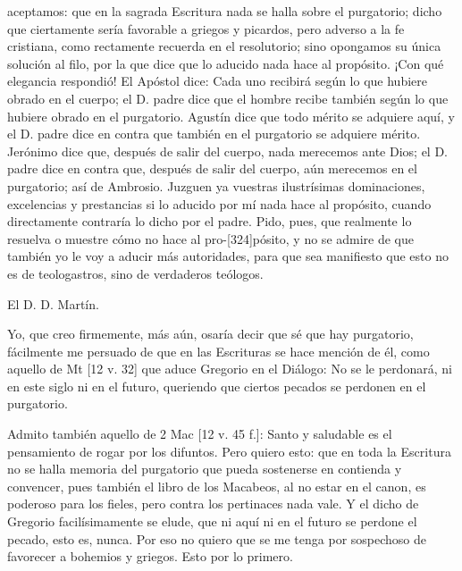 aceptamos: que en la sagrada Escritura nada se halla sobre el purgatorio; dicho que ciertamente sería favorable a griegos y picardos, pero adverso a la fe cristiana, como rectamente recuerda en el resolutorio; sino opongamos su única solución al filo, por la que dice que lo aducido nada hace al propósito. ¡Con qué elegancia respondió! El Apóstol dice: Cada uno recibirá según lo que hubiere obrado en el cuerpo; el D. padre dice que el hombre recibe también según lo que hubiere obrado en el purgatorio. Agustín dice que todo mérito se adquiere aquí, y el D. padre dice en contra que también en el purgatorio se adquiere mérito. Jerónimo dice que, después de salir del cuerpo, nada merecemos ante Dios; el D. padre dice en contra que, después de salir del cuerpo, aún merecemos en el purgatorio; así de Ambrosio. Juzguen ya vuestras ilustrísimas dominaciones, excelencias y prestancias si lo aducido por mí nada hace al propósito, cuando directamente contraría lo dicho por el padre. Pido, pues, que realmente lo resuelva o muestre cómo no hace al pro-[324]pósito, y no se admire de que también yo le voy a aducir más autoridades, para que sea manifiesto que esto no es de teologastros, sino de verdaderos teólogos.

El D. D. Martín.

Yo, que creo firmemente, más aún, osaría decir que sé que hay purgatorio, fácilmente me persuado de que en las Escrituras se hace mención de él, como aquello de Mt [12 v. 32] que aduce Gregorio en el Diálogo: No se le perdonará, ni en este siglo ni en el futuro, queriendo que ciertos pecados se perdonen en el purgatorio.

Admito también aquello de 2 Mac [12 v. 45 f.]: Santo y saludable es el pensamiento de rogar por los difuntos. Pero quiero esto: que en toda la Escritura no se halla memoria del purgatorio que pueda sostenerse en contienda y convencer, pues también el libro de los Macabeos, al no estar en el canon, es poderoso para los fieles, pero contra los pertinaces nada vale. Y el dicho de Gregorio facilísimamente se elude, que ni aquí ni en el futuro se perdone el pecado, esto es, nunca. Por eso no quiero que se me tenga por sospechoso de favorecer a bohemios y griegos. Esto por lo primero.

